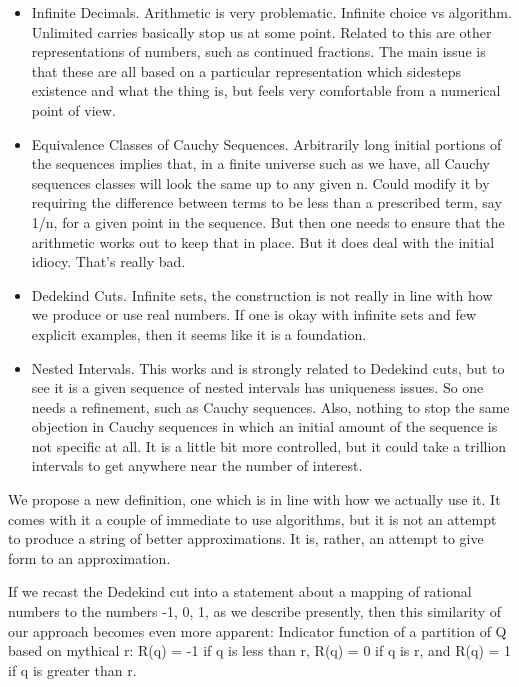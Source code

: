 \documentclass[12pt]{article}
\theoremstyle{remark}
\begin{document}
\begin{itemize}
    \item Infinite Decimals. Arithmetic is very problematic. Infinite choice vs
  algorithm. Unlimited carries basically stop us at some point. Related to
  this are other representations of numbers, such as continued fractions. The
  main issue is that these are all based on a particular representation which
  sidesteps existence and what the thing is, but feels very comfortable from a
  numerical point of view. 
  \item Equivalence Classes of Cauchy Sequences. Arbitrarily long initial portions
  of the sequences implies that, in a finite universe such as we have, all
  Cauchy sequences classes will look the same up to any given n. Could modify
  it by requiring the difference between terms to be less than a prescribed
  term, say 1/n, for a given point in the sequence. But then one needs to
  ensure that the arithmetic works out to keep that in place. But it does deal
  with the initial idiocy. That's really bad. 
  \item Dedekind Cuts. Infinite sets, the construction is not really in line with
  how we produce or use real numbers. If one is okay with infinite sets and
  few explicit examples, then it seems like it is a foundation. 
  \item Nested Intervals. This works and is strongly related to Dedekind cuts, but
  to see it is a given sequence of nested intervals has uniqueness issues. So
  one needs a refinement, such as Cauchy sequences. Also, nothing to stop the
  same objection in Cauchy sequences in which an initial amount of the
  sequence is not specific at all. It is a little bit more controlled, but it
  could take a trillion intervals to get anywhere near the number of interest.
\end{itemize}


We propose a new definition, one which is in line with how we actually use it.
It comes with it a couple of immediate to use algorithms, but it is not an
attempt to produce a string of better approximations. It is, rather, an
attempt to give form to an approximation.

If we recast the Dedekind cut into a statement about a mapping of rational
numbers to the numbers -1, 0, 1, as we describe presently, then this
similarity of our approach becomes even more apparent: 
Indicator function of a partition of Q based on mythical r: 
R(q) = -1 if q is less than r, R(q) = 0 if q is r, and R(q) = 1 if q is
greater than r. 
\end{document}
